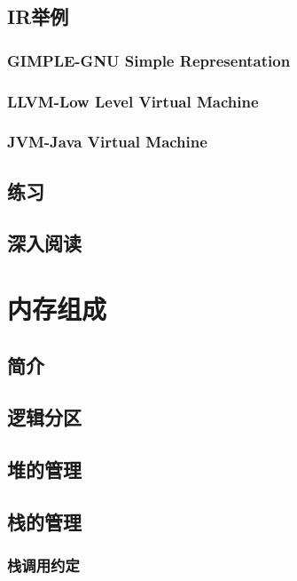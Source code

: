 \documentclass[cn,11pt,chinese]{elegantbook}
\begin{document}
\section{IR举例}

\subsection{GIMPLE-GNU Simple Representation}

\subsection{LLVM-Low Level Virtual Machine}

\subsection{JVM-Java Virtual Machine}

\section{练习}

\section{深入阅读}

\chapter{内存组成}

\section{简介}

\section{逻辑分区}

\section{堆的管理}

\section{栈的管理}

\subsection{栈调用约定}
\end{document}
